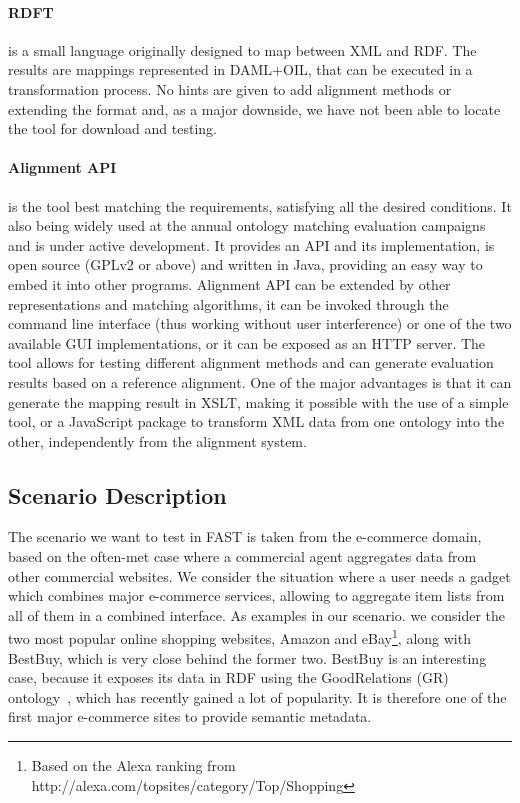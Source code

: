 \paragraph{RDFT}
\cite{omelayenko2002rdft} is a small language originally designed to map between XML and RDF. The results are mappings represented in DAML+OIL, that can be executed in a transformation process. No hints are given to add alignment methods or extending the format and, as a major downside, we have not been able to locate the tool for download and testing.

\paragraph{Alignment API} \cite{euzenat2004api} is the tool best matching the requirements, satisfying all the desired conditions. It also being widely used at the annual ontology matching evaluation campaigns and is under active development. It provides an API and its implementation, is open source (GPLv2 or above) and written in Java, providing an easy way to embed it into other programs. Alignment API can be extended by other representations and matching algorithms, it can be invoked through the command line interface (thus working without user interference) or one of the two available GUI implementations, or it can be exposed as an HTTP server. The tool allows for testing different alignment methods and can generate evaluation results based on a reference alignment. One of the major advantages is that it can generate the mapping result in XSLT, making it possible with the use of a simple tool, or a JavaScript package to transform XML data from one ontology into the other, independently from the alignment system.

\subsection{Scenario Description}
\label{scenario}

The scenario we want to test in FAST is taken from the e-commerce domain, based on the often-met case where a commercial agent aggregates data from other commercial websites. We consider the situation where a user needs a gadget which combines major e-commerce services, allowing to aggregate item lists from all of them in a combined interface.
As examples in our scenario. we consider the two most popular online shopping websites, Amazon and eBay\footnote{Based on the Alexa ranking from http://alexa.com/topsites/category/Top/Shopping}, along with BestBuy, which is very close behind the former two. BestBuy is an interesting case, because it exposes its data in RDF using the GoodRelations (GR) ontology~\cite{hepp-goodrelations}, which has recently gained a lot of popularity. It is therefore one of the first major e-commerce sites to provide semantic metadata.

